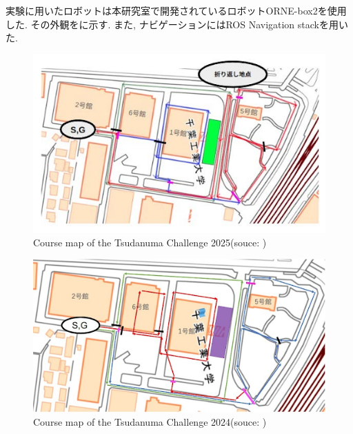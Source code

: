実験に用いたロボットは本研究室で開発されているロボットORNE-box2\cite{井口颯人2023屋外自律移動ロボットプラットフォーム-orne}を使用した. 
その外観をに示す. 
また, ナビゲーションにはROS Navigation stackを用いた. 
\begin{figure}[hbtp]
  \centering
 \includegraphics[keepaspectratio, scale=0.5]
      {images/2025tsudacha.png}
 \caption{Course map of the Tsudanuma Challenge 2025(souce: \cite{tsudachare})}
 \label{Fig:Course map of the Tsudanuma Challenge 2025}
\end{figure}
\begin{figure}[hbtp]
  \centering
 \includegraphics[keepaspectratio, scale=0.5]
      {images/2024tsudacha.png}
 \caption{Course map of the Tsudanuma Challenge 2024(souce: \cite{tsudachare})}
 \label{Fig:Course map of the Tsudanuma Challenge 2024}
\end{figure}
